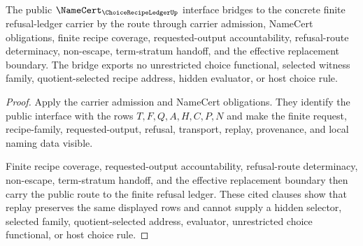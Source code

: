 \begin{theorem}
\label{thm:choice-recipe-ledger-public-bridge}
The public $\NameCert_{\ChoiceRecipeLedgerUp}$ interface bridges to the concrete finite refusal-ledger carrier by the route through carrier admission, NameCert obligations, finite recipe coverage, requested-output accountability, refusal-route determinacy, non-escape, term-stratum handoff, and the effective replacement boundary. The bridge exports no unrestricted choice functional, selected witness family, quotient-selected recipe address, hidden evaluator, or host choice rule.
\end{theorem}
\begin{proof}
Apply the carrier admission and NameCert obligations. They identify the public interface with the rows $T,F,Q,A,H,C,P,N$ and make the finite request, recipe-family, requested-output, refusal, transport, replay, provenance, and local naming data visible.

Finite recipe coverage, requested-output accountability, refusal-route determinacy, non-escape, term-stratum handoff, and the effective replacement boundary then carry the public route to the finite refusal ledger. These cited clauses show that replay preserves the same displayed rows and cannot supply a hidden selector, selected family, quotient-selected address, evaluator, unrestricted choice functional, or host choice rule.
\end{proof}

